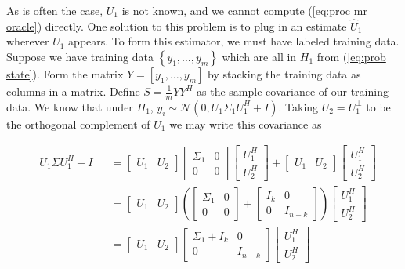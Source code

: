 \documentclass[english]{article}
\begin{document}
As is often the case, $U_1$ is not known, and we cannot compute (\ref{eq:proc mr oracle}) directly. One solution to this problem is to plug in an estimate $\hat{U}_1$ wherever $U_1$ appears. To form this estimator, we must have labeled training data. Suppose we have training data $\left\{y_1,\dots,y_m\right\}$ which are all in $H_1$ from (\ref{eq:prob state}). Form the matrix $Y=[y_1,\dots,y_m]$ by stacking the training data as columns in a matrix. Define $S=\frac{1}{m}YY^H$ as the sample covariance of our training data. We know that under $H_1$, $y_i\sim\mathcal{N}(0,U_1\Sigma_1U_1^H+I)$. Taking $U_2=U_1^{\perp}$ to be the orthogonal complement of $U_1 $ we may write this covariance as

\begin{equation}
\begin{aligned}
&U_1\Sigma U_1^H+I
&&=\left[\begin{array}{lr} U_1 & U_2\end{array}\right]\left[\begin{array}{lr}\Sigma_1 & 0\\ 0 & 0\end{array}\right]\left[\begin{array}{lr}U_1^H \\ U_2^H\end{array}\right] + \left[\begin{array}{lr}U_1 & U_2\end{array}\right]\left[\begin{array}{lr}U_1^H \\ U_2^H\end{array}\right]\\
&&&=\left[\begin{array}{lr} U_1 & U_2\end{array}\right]\left(\left[\begin{array}{lr}\Sigma_1 & 0\\ 0 & 0\end{array}\right]+\left[\begin{array}{lr}I_k & 0\\ 0 & I_{n-k}\end{array}\right]\right)\left[\begin{array}{lr}U_1^H \\ U_2^H\end{array}\right]\\
&&&=\left[\begin{array}{lr} U_1 & U_2\end{array}\right]\left[\begin{array}{lr}\Sigma_1+I_k & 0\\ 0 & I_{n-k}\end{array}\right]\left[\begin{array}{lr}U_1^H \\ U_2^H\end{array}\right]\\
\end{aligned}
\end{equation}
\end{document}
